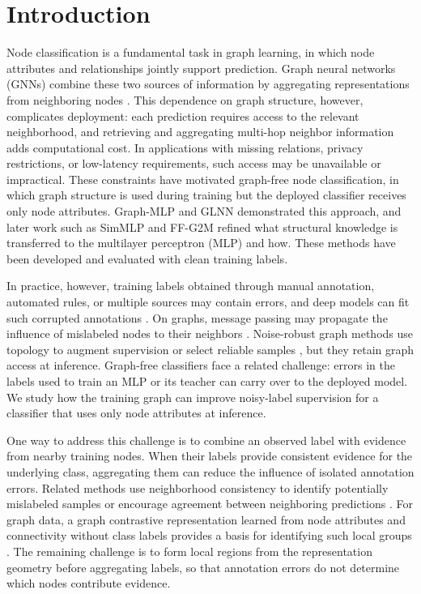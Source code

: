 \documentclass[times,review,10pt]{elsarticle}
\theoremstyle{definition}
\theoremstyle{plain}
\begin{document}
\section{Introduction}\label{sec:1}

Node classification is a fundamental task in graph learning, in which node attributes and relationships jointly support prediction. Graph neural networks (GNNs) combine these two sources of information by aggregating representations from neighboring nodes \cite{ref1}. This dependence on graph structure, however, complicates deployment: each prediction requires access to the relevant neighborhood, and retrieving and aggregating multi-hop neighbor information adds computational cost. In applications with missing relations, privacy restrictions, or low-latency requirements, such access may be unavailable or impractical. These constraints have motivated graph-free node classification, in which graph structure is used during training but the deployed classifier receives only node attributes. Graph-MLP \cite{ref3} and GLNN \cite{ref4} demonstrated this approach, and later work such as SimMLP \cite{ref41} and FF-G2M \cite{ref45} refined what structural knowledge is transferred to the multilayer perceptron (MLP) and how. These methods have been developed and evaluated with clean training labels.

In practice, however, training labels obtained through manual annotation, automated rules, or multiple sources may contain errors, and deep models can fit such corrupted annotations \cite{ref24}. On graphs, message passing may propagate the influence of mislabeled nodes to their neighbors \cite{ref6}. Noise-robust graph methods use topology to augment supervision \cite{ref7} or select reliable samples \cite{ref9}, but they retain graph access at inference. Graph-free classifiers face a related challenge: errors in the labels used to train an MLP or its teacher can carry over to the deployed model. We study how the training graph can improve noisy-label supervision for a classifier that uses only node attributes at inference.

One way to address this challenge is to combine an observed label with evidence from nearby training nodes. When their labels provide consistent evidence for the underlying class, aggregating them can reduce the influence of isolated annotation errors. Related methods use neighborhood consistency to identify potentially mislabeled samples or encourage agreement between neighboring predictions \cite{ref10,ref11}. For graph data, a graph contrastive representation learned from node attributes and connectivity without class labels provides a basis for identifying such local groups \cite{ref12}. The remaining challenge is to form local regions from the representation geometry before aggregating labels, so that annotation errors do not determine which nodes contribute evidence.
\end{document}
